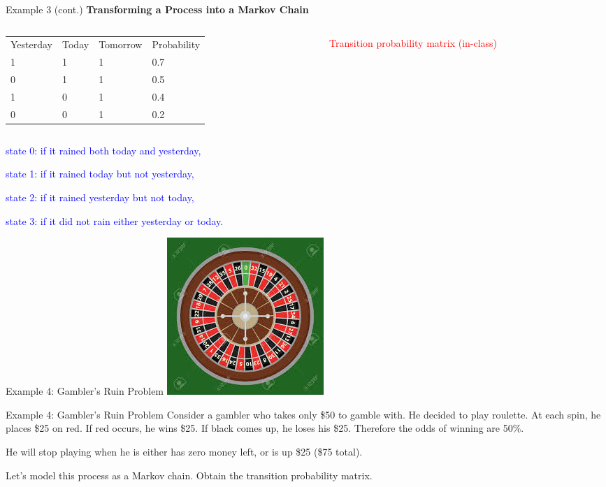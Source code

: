 \documentclass[12pt,ignorenonframetext,]{beamer}
\begin{document}
\begin{frame}{Example 3 (cont.)}
\protect\hypertarget{example-3-cont.}{}
\textbf{Transforming a Process into a Markov Chain}

\begin{columns}
\begin{column}{0.6\textwidth}
\begin{table}[]
\begin{tabular}{llll}
Yesterday & Today & Tomorrow  & Probability \\
1 & 1 & 1 & 0.7 \\
0 & 1 & 1 & 0.5 \\
1 & 0 & 1 & 0.4 \\
0 & 0 & 1 & 0.2 
\end{tabular}
\end{table}
\end{column}
\begin{column}{0.2\textwidth}
 \textcolor{red}{Transition probability matrix (in-class)} 
\end{column}
\end{columns}

\textcolor{blue}{state 0: if it rained both today and yesterday,}

\textcolor{blue}{state 1: if it rained today but not yesterday,}

\textcolor{blue}{state 2: if it rained yesterday but not today,}

\textcolor{blue}{state 3: if it did not rain either yesterday or today.}
\end{frame}

\begin{frame}{Example 4: Gambler's Ruin Problem}
\protect\hypertarget{example-4-gamblers-ruin-problem}{}
\includegraphics{roulette.jpeg}
\end{frame}

\begin{frame}{Example 4: Gambler's Ruin Problem}
\protect\hypertarget{example-4-gamblers-ruin-problem-1}{}
Consider a gambler who takes only \$50 to gamble with. He decided to
play roulette. At each spin, he places \$25 on red. If red occurs, he
wins \$25. If black comes up, he loses his \$25. Therefore the odds of
winning are 50\%.

He will stop playing when he is either has zero money left, or is up
\$25 (\$75 total).

Let's model this process as a Markov chain. Obtain the transition
probability matrix.
\end{frame}
\end{document}
